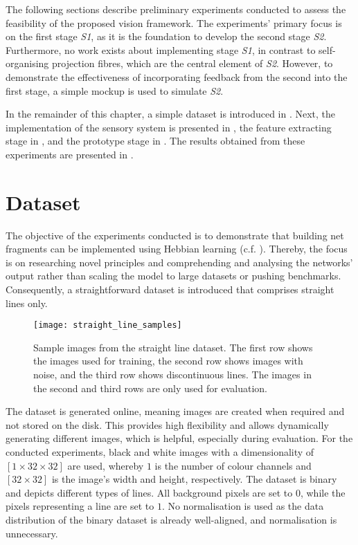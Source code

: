 The following sections describe preliminary experiments conducted to assess the feasibility of the proposed vision framework.
The experiments' primary focus is on the first stage \emph{S1}, as it is the foundation to develop the second stage \emph{S2}. Furthermore, no work exists about implementing stage \emph{S1}, in contrast to self-organising projection fibres, which are the central element of \emph{S2}.
However, to demonstrate the effectiveness of incorporating feedback from the second into the first stage, a simple mockup is used to simulate \emph{S2}.

In the remainder of this chapter, a simple dataset is introduced in . Next, the implementation of the sensory system is presented in , the feature extracting stage in , and the prototype stage in . The results obtained from these experiments are presented in .


\section{Dataset}
The objective of the experiments conducted is to demonstrate that building net fragments can be implemented using Hebbian learning  (c.f. ).
Thereby, the focus is on researching novel principles and comprehending and analysing the networks' output rather than scaling the model to large datasets or pushing benchmarks.
Consequently, a straightforward dataset is introduced that comprises straight lines only.


\begin{figure}[h]
    \centering
    \texttt{[image: straight\_line\_samples]}
    \caption[Sample images from the dataset]{Sample images from the straight line dataset. The first row shows the images used for training, the second row shows images with noise, and the third row shows discontinuous lines. The images in the second and third rows are only used for evaluation.}
\end{figure}


The dataset is generated online, meaning images are created when required and not stored on the disk. This provides high flexibility and allows dynamically generating different images, which is helpful, especially during evaluation.
For the conducted experiments, black and white images with a dimensionality of $[1 \times 32 \times 32]$ are used, whereby $1$ is the number of colour channels and $[32 \times 32]$ is the image's width and height, respectively.
The dataset is binary and depicts different types of lines.
All background pixels are set to $0$, while the pixels representing a line are set to $1$.
No normalisation is used as the data distribution of the binary dataset is already well-aligned, and normalisation is unnecessary.

